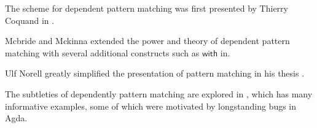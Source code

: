 
The scheme for dependent pattern matching was first presented by Thierry
Coquand in \cite{coquand1992pattern}.

Mcbride and Mckinna extended the power and theory of dependent pattern
matching with several additional constructs such as $\mathsf{with}$
in\cite{mcbride_mckinna_2004}.

Ulf Norell greatly simplified the presentation of pattern matching
in his thesis \cite{norell2007towards}.


The subtleties of dependently pattern matching are explored in \cite{cockx_devriese_2018},
which has many informative examples, some of which were motivated
by longstanding bugs in Agda.



